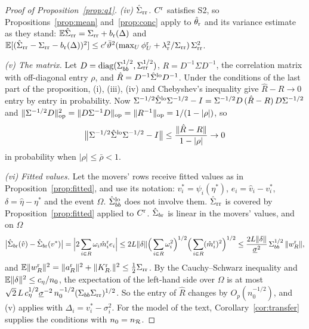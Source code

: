 \begin{proof}[Proof of Proposition~\ref{prop:q1}]
\emph{(iv) $\hat\Sigma_{\rm rr}$.} $C^{\rm r}$ satisfies S2, so Propositions~\ref{prop:mean} and~\ref{prop:conc} apply to
$\hat\theta_{\rm r}$ and its variance estimate as they stand: $\mathbb{E}\hat\Sigma_{\rm rr}=\Sigma_{\rm rr}+b_{\rm r}(\Delta)$ and
$\mathbb{E}[(\hat\Sigma_{\rm rr}-\Sigma_{\rm rr}-b_{\rm r}(\Delta))^2]\le c'\bar\vartheta^2(\max_U\phi^{\rm r}_U+\lambda_{\rm r}^2/\Sigma_{\rm rr})\,\Sigma_{\rm rr}^2$.

\emph{(v) The matrix.} Let $D=\operatorname{diag}(\Sigma_{bb}^{1/2},\Sigma_{\rm rr}^{1/2})$, $R=D^{-1}\Sigma D^{-1}$, the
correlation matrix with off-diagonal entry $\rho$, and $\hat R=D^{-1}\hat\Sigma^{\rm lo}D^{-1}$. Under the
conditions of the last part of the proposition, (i), (iii), (iv) and Chebyshev's inequality give $\hat R-R\to0$
entry by entry in probability. Now
$\Sigma^{-1/2}\hat\Sigma^{\rm lo}\Sigma^{-1/2}-I=\Sigma^{-1/2}D\,(\hat R-R)\,D\Sigma^{-1/2}$ and
$\|\Sigma^{-1/2}D\|_{\mathrm{op}}^2=\|D\Sigma^{-1}D\|_{\mathrm{op}}=\|R^{-1}\|_{\mathrm{op}}=1/(1-|\rho|)$, so
\[
\big\|\Sigma^{-1/2}\hat\Sigma^{\rm lo}\Sigma^{-1/2}-I\big\|\le\frac{\|\hat R-R\|}{1-|\rho|}\to0
\]
in probability when $|\rho|\le\bar\rho<1$.

\emph{(vi) Fitted values.} Let the movers' rows receive fitted values as in Proposition~\ref{prop:fitted}, and use
its notation: $v^*_i=\psi_i(\eta^*)$, $e_i=\hat v_i-v_i^*$, $\delta=\hat\eta-\eta^*$ and the event $\Omega$.
$\hat\Sigma_{bb}^{\rm lo}$ does not involve them. $\hat\Sigma_{\rm rr}$ is covered by Proposition~\ref{prop:fitted} applied to
$C^{\rm r}$. $\hat\Sigma_{b{\rm r}}$ is linear in the movers' values, and on $\Omega$
\[
\big|\hat\Sigma_{b{\rm r}}(\hat v)-\hat\Sigma_{b{\rm r}}(v^*)\big|=\Big|2\sum_{i\in R}\omega_i\hat m_i^{\rm r}e_i\Big|
\le2L\|\delta\|\Big(\sum_{i\in R}\omega_i^2\Big)^{1/2}\Big(\sum_{i\in R}(\hat m_i^{\rm r})^2\Big)^{1/2}
\le\frac{2L\|\delta\|}{\underline\sigma^{2}}\,\Sigma_{bb}^{1/2}\,\|w^{\rm r}_R\|,
\]
and $\mathbb{E}\|w^{\rm r}_R\|^2=\|a^{\rm r}_R\|^2+\|K^{\rm r}_{R\cdot}\|^2\le\frac12\Sigma_{\rm rr}$. By the Cauchy--Schwarz inequality
and $\mathbb{E}\|\delta\|^2\le c_\eta/n_0$, the expectation of the left-hand side over $\Omega$ is at most
$\sqrt2\,L\,c_\eta^{1/2}\underline\sigma^{-2}\,n_0^{-1/2}(\Sigma_{bb}\Sigma_{\rm rr})^{1/2}$. So the entry of $\hat R$ changes
by $O_p(n_0^{-1/2})$, and (v) applies with $\Delta_i=v_i^*-\sigma_i^2$. For the model of the text,
Corollary~\ref{cor:transfer} supplies the conditions with $n_0=n_{\mathcal{R}}$.
\end{proof}


